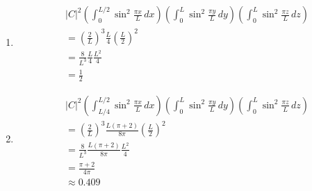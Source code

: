 \documentclass{article}
\begin{document}
\begin{enumerate}
  \item

        \begin{align*}
           & |C|^2 \left( \int_0^{L / 2} \sin^2 \frac{\pi x}{L} \,dx \right) \left( \int_0^L \sin^2 \frac{\pi y}{L} \,dy \right) \left( \int_0^L \sin^2 \frac{\pi z}{L} \,dz \right) \\
           & = \left( \frac{2}{L} \right)^3 \frac{L}{4} \left( \frac{L}{2} \right)^2                                                                                                 \\
           & = \frac{8}{L^3} \frac{L}{4} \frac{L^2}{4}                                                                                                                               \\
           & = \frac{1}{2}
        \end{align*}

  \item

        \begin{align*}
           & |C|^2 \left( \int_{L / 4}^{L / 2} \sin^2 \frac{\pi x}{L} \,dx \right) \left( \int_0^L \sin^2 \frac{\pi y}{L} \,dy \right) \left( \int_0^L \sin^2 \frac{\pi z}{L} \,dz \right) \\
           & = \left( \frac{2}{L} \right)^3 \frac{L (\pi + 2)}{8 \pi} \left( \frac{L}{2} \right)^2                                                                                         \\
           & = \frac{8}{L^3} \frac{L (\pi + 2)}{8 \pi} \frac{L^2}{4}                                                                                                                       \\
           & = \frac{\pi + 2}{4 \pi}                                                                                                                                                       \\
           & \approx 0.409
        \end{align*}
\end{enumerate}

\setcounter{subsubsection}{46}
\subsubsection{}
\end{document}
